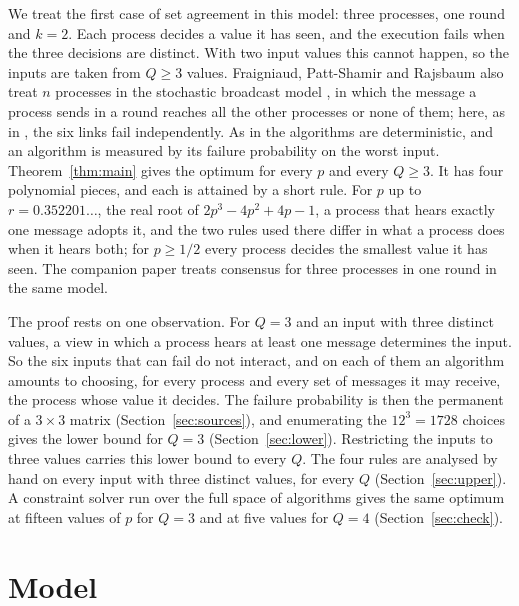 \documentclass[11pt]{article}
\theoremstyle{remark}
\begin{document}
We treat the first case of set agreement in this model: three processes, one round and $k=2$. Each process decides a value it has seen, and the execution fails when the three decisions are distinct. With two input values this cannot happen, so the inputs are taken from $Q\ge3$ values. Fraigniaud, Patt-Shamir and Rajsbaum also treat $n$ processes in the stochastic broadcast model \cite{FPR26}, in which the message a process sends in a round reaches all the other processes or none of them; here, as in \cite{FPR}, the six links fail independently. As in \cite{FPR,FPR26} the algorithms are deterministic, and an algorithm is measured by its failure probability on the worst input. Theorem~\ref{thm:main} gives the optimum for every $p$ and every $Q\ge3$. It has four polynomial pieces, and each is attained by a short rule. For $p$ up to $r=0.352201\dots$, the real root of $2p^3-4p^2+4p-1$, a process that hears exactly one message adopts it, and the two rules used there differ in what a process does when it hears both; for $p\ge1/2$ every process decides the smallest value it has seen. The companion paper \cite{Companion} treats consensus for three processes in one round in the same model.

The proof rests on one observation. For $Q=3$ and an input with three distinct values, a view in which a process hears at least one message determines the input. So the six inputs that can fail do not interact, and on each of them an algorithm amounts to choosing, for every process and every set of messages it may receive, the process whose value it decides. The failure probability is then the permanent of a $3\times3$ matrix (Section~\ref{sec:sources}), and enumerating the $12^3=1728$ choices gives the lower bound for $Q=3$ (Section~\ref{sec:lower}). Restricting the inputs to three values carries this lower bound to every $Q$. The four rules are analysed by hand on every input with three distinct values, for every $Q$ (Section~\ref{sec:upper}). A constraint solver run over the full space of algorithms gives the same optimum at fifteen values of $p$ for $Q=3$ and at five values for $Q=4$ (Section~\ref{sec:check}).

\section{Model}\label{sec:model}
\end{document}
